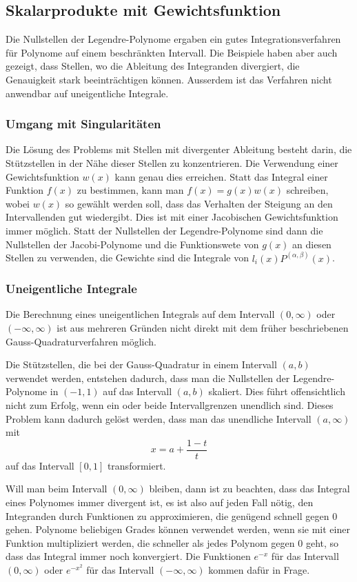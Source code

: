 \subsection{Skalarprodukte mit Gewichtsfunktion}
Die Nullstellen der Legendre-Polynome ergaben ein gutes
Integrationsverfahren für Polynome auf einem beschränkten
Intervall.
Die Beispiele haben aber auch gezeigt, dass Stellen, wo die
Ableitung des Integranden divergiert, die Genauigkeit stark
beeinträchtigen können.
Ausserdem ist das Verfahren nicht anwendbar auf uneigentliche
Integrale.

\subsubsection{Umgang mit Singularitäten}
Die Lösung des Problems mit Stellen mit divergenter Ableitung
besteht darin, die Stützstellen in der Nähe dieser Stellen
zu konzentrieren.
Die Verwendung einer Gewichtsfunktion $w(x)$ kann genau dies
erreichen.
Statt das Integral einer Funktion $f(x)$ zu bestimmen, 
kann man $f(x)=g(x)w(x)$ schreiben, wobei $w(x)$ so
gewählt werden soll, dass das Verhalten der Steigung an
den Intervallenden gut wiedergibt.
Dies ist mit einer Jacobischen Gewichtsfunktion immer möglich.
Statt der Nullstellen der Legendre-Polynome sind dann die
Nullstellen der Jacobi-Polynome  und die Funktionswete von $g(x)$
an diesen Stellen zu verwenden,  die Gewichte sind
die Integrale von $l_i(x) P^{(\alpha,\beta)}(x)$.

\subsubsection{Uneigentliche Integrale}
Die Berechnung eines uneigentlichen Integrals auf dem Intervall
$(0,\infty)$ oder $(-\infty,\infty)$ ist aus mehreren Gründen nicht
direkt mit dem früher beschriebenen Gauss-Quadraturverfahren
möglich.

Die Stützstellen, die bei der Gauss-Quadratur in einem Intervall
$(a,b)$ verwendet werden, entstehen dadurch, dass man die Nullstellen
der Legendre-Polynome in $(-1,1)$ auf das Intervall $(a,b)$
skaliert.
Dies führt offensichtlich nicht zum Erfolg, wenn ein oder beide
Intervallgrenzen unendlich sind.
Dieses Problem kann dadurch gelöst werden, dass man das unendliche
Intervall $(a,\infty)$ mit
\[
x =  a + \frac{1-t}{t}
\]
auf das Intervall $[0,1]$ transformiert.

Will man beim Intervall $(0,\infty)$ bleiben, dann ist zu beachten,
dass das Integral eines Polynomes immer divergent ist, es ist also
auf jeden Fall nötig, den Integranden durch Funktionen zu approximieren,
die genügend schnell gegen $0$ gehen.
Polynome beliebigen Grades können verwendet werden, wenn sie mit
einer Funktion multipliziert werden, die schneller als jedes Polynom
gegen $0$ geht, so dass das Integral immer noch konvergiert.
Die Funktionen $e^{-x}$ für das Intervall $(0,\infty)$ oder
$e^{-x^2}$ für das Intervall $(-\infty,\infty)$ kommen dafür in Frage.


